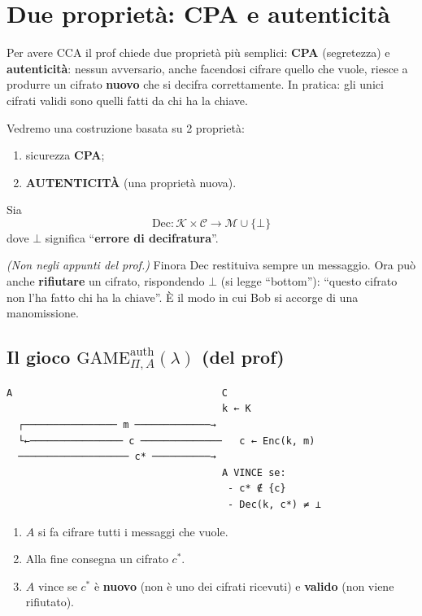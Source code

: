\section{Due proprietà: CPA e autenticità}

\begin{inbreve}
Per avere CCA il prof chiede due proprietà più semplici: \textbf{CPA} (segretezza) e \textbf{autenticità}: nessun avversario, anche facendosi cifrare quello che vuole, riesce a produrre un cifrato \textbf{nuovo} che si decifra correttamente. In pratica: gli unici cifrati validi sono quelli fatti da chi ha la chiave.
\end{inbreve}

Vedremo una costruzione basata su 2 proprietà:
\begin{enumerate}
  \item sicurezza \textbf{CPA};
  \item \textbf{AUTENTICITÀ} (una proprietà nuova).
\end{enumerate}

Sia
\[
\text{Dec} : \mathcal{K} \times \mathcal{C} \to \mathcal{M} \cup \{\bot\}
\]
dove \(\bot\) significa ``\textbf{errore di decifratura}''.

\begin{nota}
\emph{(Non negli appunti del prof.)} Finora Dec restituiva sempre un messaggio. Ora può anche \textbf{rifiutare} un cifrato, rispondendo \(\bot\) (si legge ``bottom''): ``questo cifrato non l'ha fatto chi ha la chiave''. È il modo in cui Bob si accorge di una manomissione.
\end{nota}

\subsection{Il gioco \texorpdfstring{\(\text{GAME}^{\text{auth}}_{\Pi, A}(\lambda)\)}{GAME auth} (del prof)}

\begin{verbatim}
A                                    C
                                     k ← K
  ┌──────────────── m ─────────────→
  └←──────────────── c ──────────────   c ← Enc(k, m)
  ─────────────────── c* ──────────→
                                     A VINCE se:
                                      - c* ∉ {c}
                                      - Dec(k, c*) ≠ ⊥
\end{verbatim}

\begin{enumerate}
  \item \(A\) si fa cifrare tutti i messaggi che vuole.
  \item Alla fine consegna un cifrato \(c^*\).
  \item \(A\) vince se \(c^*\) è \textbf{nuovo} (non è uno dei cifrati ricevuti) e \textbf{valido} (non viene rifiutato).
\end{enumerate}

